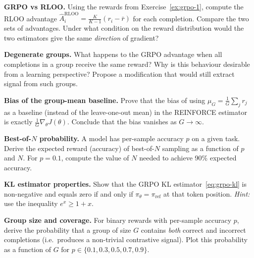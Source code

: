 \begin{exercise}
\label{ex:grpo-2}
\textbf{GRPO vs RLOO.}  Using the rewards from Exercise~\ref{ex:grpo-1}, compute the RLOO advantage $\hat{A}_i^{\mathrm{RLOO}} = \frac{K}{K-1}(r_i - \bar{r})$ for each completion.  Compare the two sets of advantages.  Under what condition on the reward distribution would the two estimators give the same \emph{direction} of gradient?
\end{exercise}

\begin{exercise}
\label{ex:grpo-3}
\textbf{Degenerate groups.}  What happens to the GRPO advantage when all completions in a group receive the same reward?  Why is this behaviour desirable from a learning perspective?  Propose a modification that would still extract signal from such groups.
\end{exercise}

\begin{exercise}
\label{ex:grpo-4}
\textbf{Bias of the group-mean baseline.}  Prove that the bias of using $\mu_G = \frac{1}{G}\sum_j r_j$ as a baseline (instead of the leave-one-out mean) in the REINFORCE estimator is exactly $\frac{1}{G}\nabla_\theta J(\theta)$.  Conclude that the bias vanishes as $G \to \infty$.
\end{exercise}

\begin{exercise}
\label{ex:grpo-5}
\textbf{Best-of-$N$ probability.}  A model has per-sample accuracy $p$ on a given task.  Derive the expected reward (accuracy) of best-of-$N$ sampling as a function of $p$ and $N$.  For $p = 0.1$, compute the value of $N$ needed to achieve 90\% expected accuracy.
\end{exercise}

\begin{exercise}
\label{ex:grpo-6}
\textbf{KL estimator properties.}  Show that the GRPO KL estimator~\eqref{eq:grpo-kl} is non-negative and equals zero if and only if $\pi_\theta = \pi_\mathrm{ref}$ at that token position.  \emph{Hint:} use the inequality $e^x \geq 1 + x$.
\end{exercise}

\begin{exercise}
\label{ex:grpo-7}
\textbf{Group size and coverage.}  For binary rewards with per-sample accuracy $p$, derive the probability that a group of size $G$ contains \emph{both} correct and incorrect completions (i.e.\ produces a non-trivial contrastive signal).  Plot this probability as a function of $G$ for $p \in \{0.1, 0.3, 0.5, 0.7, 0.9\}$.
\end{exercise}

